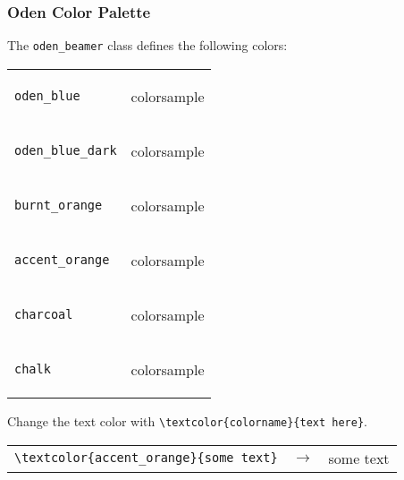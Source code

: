 \documentclass[10pt, aspectratio=169]{oden_beamer}
\begin{document}
\begin{frame}
\frametitle{Oden Color Palette}
The \texttt{oden\_beamer} class defines the following colors:

\begin{center}
\begin{tabular}{lr}
    \texttt{oden\_blue} &
        \setbeamercolor{colorsample}{bg=oden_blue}
        \begin{beamercolorbox}[wd=2cm,ht=.5cm]{colorsample}
        \end{beamercolorbox}
    \\
    \texttt{oden\_blue\_dark} &
        \setbeamercolor{colorsample}{bg=oden_blue_dark}
        \begin{beamercolorbox}[wd=2cm,ht=.5cm]{colorsample}
        \end{beamercolorbox}
    \\
    \texttt{burnt\_orange} &
        \setbeamercolor{colorsample}{bg=burnt_orange}
        \begin{beamercolorbox}[wd=2cm,ht=.5cm]{colorsample}
        \end{beamercolorbox}
    \\
    \texttt{accent\_orange} &
        \setbeamercolor{colorsample}{bg=accent_orange}
        \begin{beamercolorbox}[wd=2cm,ht=.5cm]{colorsample}
        \end{beamercolorbox}
    \\
    \texttt{charcoal} &
        \setbeamercolor{colorsample}{bg=charcoal}
        \begin{beamercolorbox}[wd=2cm,ht=.5cm]{colorsample}
        \end{beamercolorbox}
    \\
    \texttt{chalk} &
        \setbeamercolor{colorsample}{bg=chalk}
        \begin{beamercolorbox}[wd=2cm,ht=.5cm]{colorsample}
        \end{beamercolorbox}
\end{tabular}
\end{center}
Change the text color with \texttt{\textbackslash textcolor\{colorname\}\{text here\}}.
\begin{center}
\begin{tabular}{lcr}
    \texttt{\textbackslash textcolor\{accent\_orange\}\{some text\}}
    & $\longrightarrow$ &
    \textcolor{accent_orange}{some text}
\end{tabular}
\end{center}
\end{frame}
\end{document}
